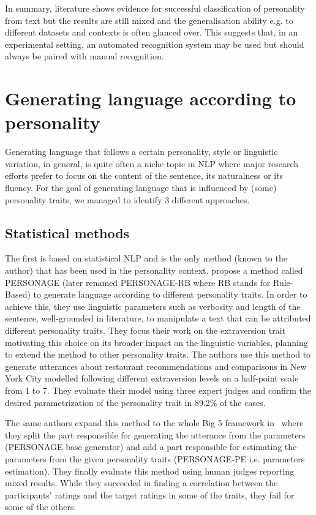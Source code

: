 \documentclass[nomenclature, english, biblatex]{kththesis}
\begin{document}
In summary, literature shows evidence for successful classification of personality from text but the results are still mixed and the generalisation ability e.g. to different datasets and contexts is often glanced over. This suggests that, in an experimental setting, an automated recognition system may be used but should always be paired with manual recognition.
\section{Generating language according to personality}
Generating language that follows a certain personality, style or linguistic variation, in general, is quite often a niche topic in \gls{NLP} where major research efforts prefer to focus on the content of the sentence, its naturalness or its fluency. For the goal of generating language that is influenced by (some) personality traits, we managed to identify 3 different approaches.

\subsection{Statistical methods}
The first is based on statistical \gls{NLP} and is the only method (known to the author) that has been used in the personality context. 
\textcite{mairesse2007personage} propose a method called PERSONAGE (later renamed PERSONAGE-RB where RB stands for Rule-Based) to generate language according to different personality traits. In order to achieve this, they use linguistic parameters such as verbosity and length of the sentence, well-grounded in literature, to manipulate a text that can be attributed different personality traits. They focus their work on the extraversion trait motivating this choice on its broader impact on the linguistic variables, planning to extend the method to other personality traits. The authors use this method to generate utterances about restaurant recommendations and comparisons in New York City modelled following different extraversion levels on a half-point scale from 1 to 7. They evaluate their model using three expert judges and confirm the desired parametrization of the personality trait in 89.2\% of the cases. 

The same authors expand this method to the whole Big 5 framework in~\cite{mairesse2011controlling} where they split the part responsible for generating the utterance from the parameters (PERSONAGE base generator) and add a part responsible for estimating the parameters from the given personality traits (PERSONAGE-PE i.e. parameters estimation). They finally evaluate this method using human judges reporting mixed results. While they succeeded in finding a correlation between the participants' ratings and the target ratings in some of the traits, they fail for some of the others. 
\end{document}
